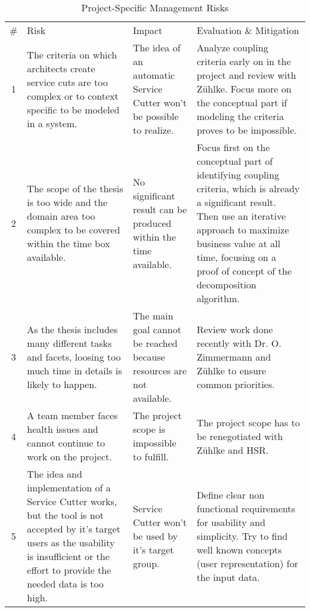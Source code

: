 \begin{table}[H]
\begin{tabular}{|c|p{120pt} p{100pt} p{140pt}|}
\hline \# & Risk & Impact & Evaluation \& Mitigation \\ 
1 & The criteria on which architects create service cuts are too complex or to context specific to be modeled in a system. & The idea of an automatic Service Cutter won't be possible to realize. & Analyze coupling criteria early on in the project and review with Z\"uhlke. Focus more on the conceptual part if modeling the criteria proves to be impossible. \\
2 & The scope of the thesis is too wide and the domain area too complex to be covered within the time box available. & No significant result can be produced within the time available. & Focus first on the conceptual part of identifying coupling criteria, which is already a significant result. Then use an iterative approach to maximize business value at all time, focusing on a proof of concept of the decomposition algorithm. \\
3 & As the thesis includes many different tasks and facets, loosing too much time in details is likely to happen. & The main goal cannot be reached because resources are not available. & Review work done recently with Dr. O. Zimmermann and Z\"uhlke to ensure common priorities. \\
4 & A team member faces health issues and cannot continue to work on the project. & The project scope is impossible to fulfill. & The project scope has to be renegotiated with Z\"uhlke and HSR. \\ 
5 & The idea and implementation of a Service Cutter works, but the tool is not accepted by it's target users as the usability is insufficient or the effort to provide the needed data is too high. & Service Cutter won't be used by it's target group. & Define clear non functional requirements for usability and simplicity. Try to find well known concepts (user representation) for the input data. \\
\hline
\end{tabular}
\caption{Project-Specific Management Risks}
\label{tab:projmgmtrisks}
\end{table}

